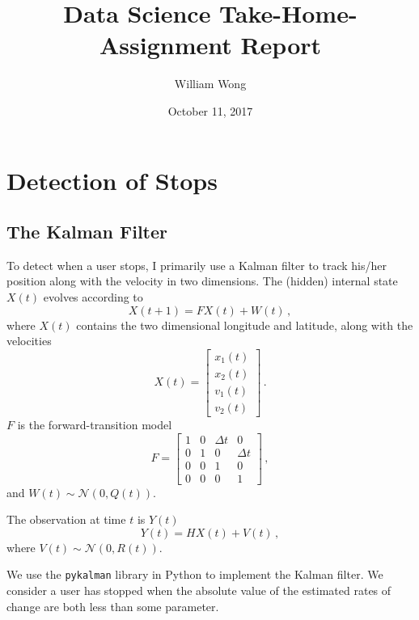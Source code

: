 \documentclass[12pt]{article}
\begin{document}
\title{Data Science Take-Home-Assignment Report}

\author{William Wong}
\date{October 11, 2017}

\maketitle


\section{Detection of Stops}

\subsection{The Kalman Filter}
To detect when a user stops, I primarily use a Kalman filter to track his/her position along with the velocity in two dimensions. The (hidden) internal state $X(t)$ evolves according to
\begin{equation}
  X(t+1) = F X(t) + W(t) \, ,
\end{equation}
where $X(t)$ contains the two dimensional longitude and latitude, along with the velocities
\begin{equation}
X(t) = \begin{bmatrix}
    x_1(t) \\
    x_2(t) \\
    v_1(t) \\
    v_2(t)
    \end{bmatrix} \, .
\end{equation}
$F$ is the forward-transition model
\begin{equation}
F = \begin{bmatrix}
    1 & 0 & \Delta t & 0 \\
    0 & 1 & 0 & \Delta t \\
    0 & 0 & 1 & 0 \\
    0 & 0 & 0 & 1
    \end{bmatrix} \, ,
\end{equation}
and $W(t) \sim \mathcal{N}(0, Q(t))$.

The observation at time $t$ is $Y(t)$
\begin{equation}
  Y(t) = H X(t) + V(t) \, ,
\end{equation}
where $V(t) \sim \mathcal{N}(0, R(t))$.

We use the {\tt pykalman} library in Python to implement the Kalman filter.
We consider a user has stopped when the absolute value of the estimated rates of change are both less than some parameter.
\end{document}
